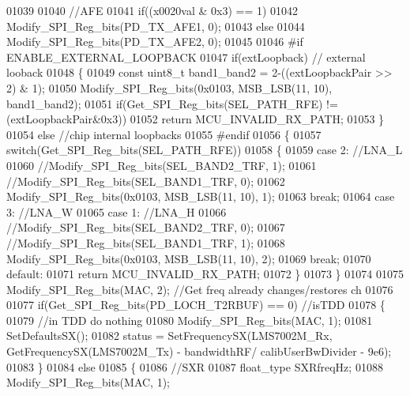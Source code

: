 \begin{DoxyCode}
{{{{{{{{{{{{{{{{{{{{01039 
01040     \textcolor{comment}{//AFE}
01041     \textcolor{keywordflow}{if}((x0020val & 0x3) == 1)
01042         Modify_SPI_Reg_bits(PD_TX_AFE1, 0);
01043     \textcolor{keywordflow}{else}
01044         Modify_SPI_Reg_bits(PD_TX_AFE2, 0);
01045 
01046 \textcolor{preprocessor}{#if ENABLE\_EXTERNAL\_LOOPBACK}
01047     \textcolor{keywordflow}{if}(extLoopback) \textcolor{comment}{// external looback}
01048     \{
01049         \textcolor{keyword}{const} uint8\_t band1\_band2 = 2-((extLoopbackPair >> 2) & 1);
01050         Modify_SPI_Reg_bits(0x0103, MSB_LSB(11, 10), band1\_band2);
01051         \textcolor{keywordflow}{if}(Get_SPI_Reg_bits(SEL_PATH_RFE) != (extLoopbackPair&0x3))
01052             \textcolor{keywordflow}{return} MCU_INVALID_RX_PATH;
01053     \}
01054     \textcolor{keywordflow}{else} \textcolor{comment}{//chip internal loopbacks}
01055 \textcolor{preprocessor}{#endif}
01056     \{
01057         \textcolor{keywordflow}{switch}(Get_SPI_Reg_bits(SEL_PATH_RFE))
01058         \{
01059         \textcolor{keywordflow}{case} 2: \textcolor{comment}{//LNA\_L}
01060             \textcolor{comment}{//Modify\_SPI\_Reg\_bits(SEL\_BAND2\_TRF, 1);}
01061             \textcolor{comment}{//Modify\_SPI\_Reg\_bits(SEL\_BAND1\_TRF, 0);}
01062             Modify_SPI_Reg_bits(0x0103, MSB_LSB(11, 10), 1);
01063             \textcolor{keywordflow}{break};
01064         \textcolor{keywordflow}{case} 3: \textcolor{comment}{//LNA\_W}
01065         \textcolor{keywordflow}{case} 1: \textcolor{comment}{//LNA\_H}
01066             \textcolor{comment}{//Modify\_SPI\_Reg\_bits(SEL\_BAND2\_TRF, 0);}
01067             \textcolor{comment}{//Modify\_SPI\_Reg\_bits(SEL\_BAND1\_TRF, 1);}
01068             Modify_SPI_Reg_bits(0x0103, MSB_LSB(11, 10), 2);
01069             \textcolor{keywordflow}{break};
01070         \textcolor{keywordflow}{default}:
01071             \textcolor{keywordflow}{return} MCU_INVALID_RX_PATH;
01072         \}
01073     \}
01074 
01075     Modify_SPI_Reg_bits(MAC, 2); \textcolor{comment}{//Get freq already changes/restores ch}
01076 
01077     \textcolor{keywordflow}{if}(Get_SPI_Reg_bits(PD_LOCH_T2RBUF) == 0) \textcolor{comment}{//isTDD}
01078     \{
01079         \textcolor{comment}{//in TDD do nothing}
01080         Modify_SPI_Reg_bits(MAC, 1);
01081         SetDefaultsSX();
01082         status = SetFrequencySX(LMS7002M_Rx, GetFrequencySX(LMS7002M_Tx) - 
      bandwidthRF/ calibUserBwDivider - 9e6);
01083     \}
01084     \textcolor{keywordflow}{else}
01085     \{
01086         \textcolor{comment}{//SXR}
01087         float_type SXRfreqHz;
01088         Modify_SPI_Reg_bits(MAC, 1);
}}}}}}}}}}}}}}}}}}}}
\end{DoxyCode}
